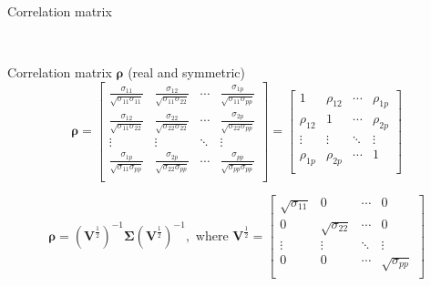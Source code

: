 \documentclass[ignorenonframetext,]{beamer}
\begin{document}
\begin{frame}

\begin{block}{Correlation matrix}

\(~\)

Correlation matrix \(\mathbf{\rho}\) (real and symmetric)
\[\mathbf{\rho}=\left[ \begin{array}{cccc}
    \frac{\sigma_{11}}{\sqrt{\sigma_{11}\sigma_{11}}} &
    \frac{\sigma_{12}}{\sqrt{\sigma_{11}\sigma_{22}}} &
    \cdots &
    \frac{\sigma_{1p}}{\sqrt{\sigma_{11}\sigma_{pp}}}\\
    \frac{\sigma_{12}}{\sqrt{\sigma_{11}\sigma_{22}}} &
    \frac{\sigma_{22}}{\sqrt{\sigma_{22}\sigma_{22}}} &
    \cdots &
    \frac{\sigma_{2p}}{\sqrt{\sigma_{22}\sigma_{pp}}}\\
    \vdots & \vdots & \ddots & \vdots\\
      \frac{\sigma_{1p}}{\sqrt{\sigma_{11}\sigma_{pp}}} &
    \frac{\sigma_{2p}}{\sqrt{\sigma_{22}\sigma_{pp}}} &
    \cdots &
    \frac{\sigma_{pp}}{\sqrt{\sigma_{pp}\sigma_{pp}}}\\ \end{array}\right]=
 \left[ \begin{array}{cccc}
    1 & \rho_{12} & \cdots & \rho_{1p}\\
    \rho_{12} & 1 & \cdots & \rho_{2p}\\
    \vdots & \vdots & \ddots & \vdots\\
    \rho_{1p} & \rho_{2p} & \cdots & 1\\
\end{array}\right]\]

\[\mathbf{\rho}=(\mathbf{V}^{\frac{1}{2}})^{-1}
    \mathbf\Sigma(\mathbf{V}^{\frac{1}{2}})^{-1}, \text{   where    }
   \mathbf{V}^{\frac{1}{2}}=
 \left[ \begin{array}{cccc}
    \sqrt{\sigma_{11}} & 0& \cdots & 0\\
    0 & \sqrt{\sigma_{22}} & \cdots & 0\\
    \vdots & \vdots & \ddots & \vdots\\
    0 & 0 & \cdots & \sqrt{\sigma_{pp}}\\
\end{array} \right]\]

\end{block}

\end{frame}
\end{document}
